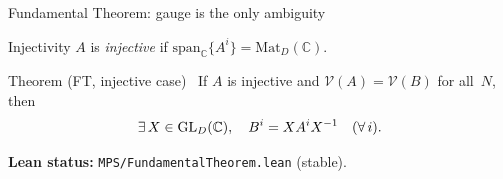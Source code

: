 \documentclass[aspectratio=169,10pt]{beamer}
\newcommand{\Mat}{\mathrm{Mat}}
\newcommand{\Span}{\mathrm{span}}
\begin{document}
\begin{frame}{Fundamental Theorem: gauge is the only ambiguity}
    \vspace{-0.6em}

    \begin{block}{Injectivity}
        $A$ is \emph{injective} if $\Span_{\mathbb{C}}\{A^i\}=\Mat_D(\mathbb{C})$.
    \end{block}

    \begin{block}{Theorem (FT, injective case)~\cite{Perez-Garcia2007Matrix,Cirac2021Matrix}}
        If $A$ is injective and $\mathcal{V}(A)=\mathcal{V}(B)$ for all~$N$, then
        \[
            \exists\,X\in \mathrm{GL}_D(\mathbb{C}),\quad B^i = X A^i X^{-1}\quad (\forall\, i).
        \]
    \end{block}

    \textcolor{dimwhite}{\footnotesize\textbf{Lean status:} 
        \texttt{MPS/FundamentalTheorem.lean} (stable).}
\end{frame}
\end{document}
